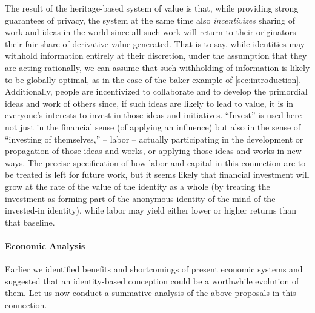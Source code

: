 \documentclass[pra,twocolumn,groupedaddress,10pt]{revtex4}
\theoremstyle{definition}
\begin{document}
The result of the heritage-based system of value is that, while providing strong guarantees of privacy, the system at the same time also \textit{incentivizes} sharing of work and ideas in the world since all such work will return to their originators their fair share of derivative value generated. That is to say, while identities may withhold information entirely at their discretion, under the assumption that they are acting rationally, we can assume that such withholding of information is likely to be globally optimal, as in the case of the baker example of \autoref{sec:introduction}. Additionally, people are incentivized to collaborate and to develop the primordial ideas and work of others since, if such ideas are likely to lead to value, it is in everyone's interests to invest in those ideas and initiatives. ``Invest'' is used here not just in the financial sense (of applying an influence) but also in the sense of ``investing of themselves,'' -- labor -- actually participating in the development or propagation of those ideas and works, or applying those ideas and works in new ways. The precise specification of how labor and capital in this connection are to be treated is left for future work, but it seems likely that financial investment will grow at the rate of the value of the identity as a whole (by treating the investment as forming part of the anonymous identity of the mind of the invested-in identity), while labor may yield either lower or higher returns than that baseline.

\paragraph{Economic Analysis} Earlier we identified benefits and shortcomings of present economic systems and suggested that an identity-based conception could be a worthwhile evolution of them. Let us now conduct a summative analysis of the above proposals in this connection.
\end{document}
